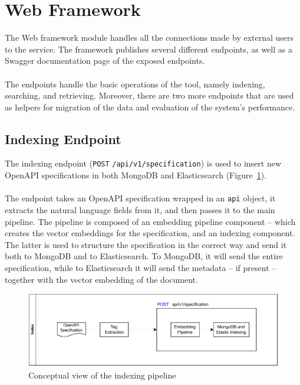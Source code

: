 \section{Web Framework}\label{sec:web-framework-1}
The Web framework module handles all the connections made by external users to the service.
The framework publishes several different endpoints, as well as a Swagger documentation page of the exposed endpoints. \\ \\
The endpoints handle the basic operations of the tool, namely indexing, searching, and retrieving.
Moreover, there are two more endpoints that are used as helpers for migration of the data and evaluation of the system's performance.

\subsection{Indexing Endpoint}\label{subsec:indexing-endpoint-1}
The indexing endpoint (\verb|POST| \verb|/api/v1/specification|) is used to insert new OpenAPI specifications in both MongoDB and Elasticsearch (Figure~\ref{fig:flow-index}). \\ \\
The endpoint takes an OpenAPI specification wrapped in an \verb|api| object, it extracts the natural language fields from it, and then passes it to the main pipeline.
The pipeline is composed of an embedding pipeline component -- which creates the vector embeddings for the specification, and an indexing component.
The latter is used to structure the specification in the correct way and send it both to MongoDB and to Elasticsearch.
To MongoDB, it will send the entire specification, while to Elasticsearch it will send the metadata -- if present -- together with the vector embedding of the document.

\begin{figure}[!h]
    \begin{center}
        \includegraphics[width=0.8\linewidth]{assets/pdf/architecture/flow-index}
    \end{center}

    \caption{Conceptual view of the indexing pipeline}
    \label{fig:flow-index}
\end{figure}

